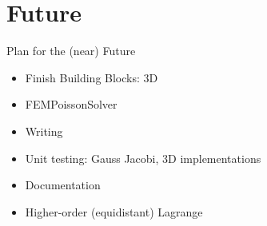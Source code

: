 \documentclass[xcolor=pdftex,table,10pt,yellow,mathserif]{beamer}
\begin{document}
\section{Future}

\begin{frame}{Plan for the (near) Future}
    \begin{itemize}
        \item Finish Building Blocks: 3D

        \item FEMPoissonSolver
        
        \pause

        \item Writing
        \item Unit testing: Gauss Jacobi, 3D implementations
        \item Documentation
        
        \pause

        \item Higher-order (equidistant) Lagrange
    \end{itemize}
\end{frame}
\end{document}
